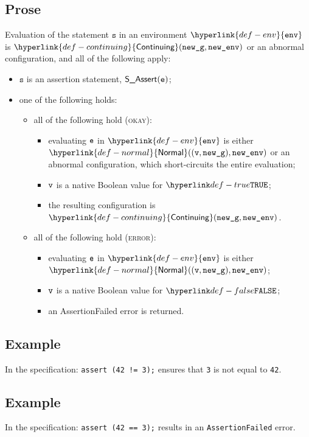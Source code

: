\documentclass{book}
\newcommand\ProseOrAbnormal[0]{or an abnormal configuration, which short-circuits the entire evaluation}
\newcommand\Normal[0]{\hyperlink{def-normal}{\textsf{Normal}}}
\newcommand\Continuing[0]{\hyperlink{def-continuing}{\textsf{Continuing}}}
\newcommand\env[0]{\hyperlink{def-env}{\texttt{env}}}
\newcommand\newg[0]{\texttt{new\_g}}
\newcommand\vs[0]{\texttt{s}}
\begin{document}
    \subsection{Prose}
    Evaluation of the statement $\vs$ in an environment $\env$ is
    $\Continuing(\newg, \newenv)$ or an abnormal configuration,
    and all of the following apply:
    \begin{itemize}
      \item $\vs$ is an assertion statement, $\textsf{S\_Assert}(\texttt{e})$;
      \item one of the following holds:
      \begin{itemize}
        \item all of the following hold (\textsc{okay}):
        \begin{itemize}
          \item evaluating $\texttt{e}$ in $\env$ is either $\Normal((\vv, \newg), \newenv)$
          \ProseOrAbnormal;
          \item $\texttt{v}$ is a native Boolean value for $\True$;
          \item the resulting configuration is $\Continuing(\newg, \newenv)$.
        \end{itemize}

        \item all of the following hold (\textsc{error}):
        \begin{itemize}
          \item evaluating $\texttt{e}$ in $\env$ is either $\Normal((\vv, \newg), \newenv)$;
          \item $\texttt{v}$ is a native Boolean value for $\False$;
          \item an AssertionFailed error is returned.
        \end{itemize}
      \end{itemize}
    \end{itemize}

    \subsection{Example}
    In the specification:
    \texttt{assert (42 != 3);} ensures that \texttt{3} is not equal to \texttt{42}.

    \subsection{Example}
    In the specification:
    \texttt{assert (42 == 3);} results in an \texttt{AssertionFailed} error.
\end{document}
